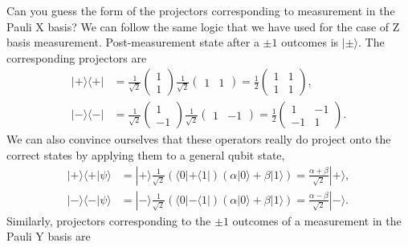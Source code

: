 Can you guess the form of the projectors corresponding to measurement in the Pauli X basis?
We can follow the same logic that we have used for the case of Z basis measurement.
Post-measurement state after a $\pm1$ outcomes is $|\pm\rangle$.
The corresponding projectors are
\begin{align}
    |+\rangle\langle+| & = \frac{1}{\sqrt{2}} \begin{pmatrix} 1 \\ 1 \end{pmatrix} \frac{1}{\sqrt{2}} \begin{pmatrix} 1 & 1 \end{pmatrix} = \frac{1}{2} \begin{pmatrix} 1 & 1 \\ 1 & 1 \end{pmatrix}, \\
    |-\rangle\langle-| & = \frac{1}{\sqrt{2}} \begin{pmatrix} 1 \\ -1 \end{pmatrix} \frac{1}{\sqrt{2}} \begin{pmatrix} 1 & -1 \end{pmatrix} = \frac{1}{2} \begin{pmatrix} 1 & -1 \\ -1 & 1 \end{pmatrix}.
\end{align}
We can also convince ourselves that these operators really do project onto the correct states by applying them to a general qubit state,
\begin{align}
    |+\rangle\langle+|\psi\rangle & = |+\rangle \frac{1}{\sqrt{2}} \left( \langle0| + \langle1| \right) \left( \alpha |0\rangle + \beta|1\rangle \right) = \frac{\alpha+\beta}{\sqrt{2}} |+\rangle, \\
    |-\rangle\langle-|\psi\rangle & = |-\rangle \frac{1}{\sqrt{2}} \left( \langle0| - \langle1| \right) \left( \alpha |0\rangle + \beta|1\rangle \right) = \frac{\alpha-\beta}{\sqrt{2}} |-\rangle.
\end{align}
Similarly, projectors corresponding to the $\pm1$ outcomes of a measurement in the Pauli Y basis are
